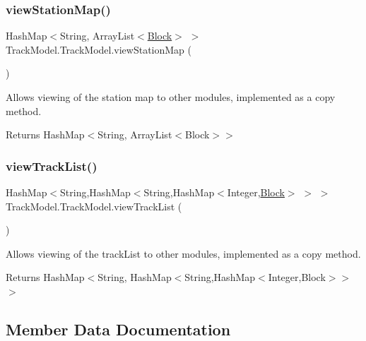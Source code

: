 \subsubsection{\texorpdfstring{view\+Station\+Map()}{viewStationMap()}}
{\footnotesize\ttfamily Hash\+Map$<$String, Array\+List$<$\hyperlink{classTrackModel_1_1Block}{Block}$>$ $>$ Track\+Model.\+Track\+Model.\+view\+Station\+Map (\begin{DoxyParamCaption}{ }\end{DoxyParamCaption})}



Allows viewing of the station map to other modules, implemented as a copy method. 

\begin{DoxyReturn}{Returns}
Hash\+Map$<$String, Array\+List$<$\+Block$>$$>$ 
\end{DoxyReturn}
\mbox{\label{classTrackModel_1_1TrackModel_ae74a6b0938494affe4c2b96b7b8f288a}} 
\subsubsection{\texorpdfstring{view\+Track\+List()}{viewTrackList()}}
{\footnotesize\ttfamily Hash\+Map$<$String,Hash\+Map$<$String,Hash\+Map$<$Integer,\hyperlink{classTrackModel_1_1Block}{Block}$>$ $>$ $>$ Track\+Model.\+Track\+Model.\+view\+Track\+List (\begin{DoxyParamCaption}{ }\end{DoxyParamCaption})}



Allows viewing of the track\+List to other modules, implemented as a copy method. 

\begin{DoxyReturn}{Returns}
Hash\+Map$<$String, Hash\+Map$<$String,Hash\+Map$<$\+Integer,\+Block$>$$>$$>$ 
\end{DoxyReturn}


\subsection{Member Data Documentation}
\mbox{\label{classTrackModel_1_1TrackModel_aad5a0edef2a616a3db51d6c5d249c896}} 
